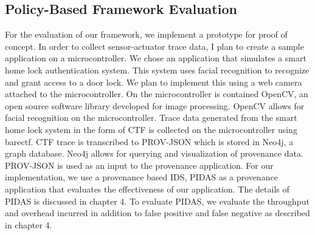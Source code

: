 


\subsection{Policy-Based Framework Evaluation}

For the evaluation of our framework, we implement a prototype for proof of concept. In order to collect sensor-actuator trace data, I plan to create a sample application on a microcontroller. We chose an application that simulates a smart home lock authentication system. This system uses facial recognition to recognize and grant access to a door lock. We plan to implement this using a web camera attached to the microcontroller. On the microcontroller is contained OpenCV, an open source software library developed for image processing. OpenCV allows for facial recognition on the microcontroller. Trace data generated from the smart home lock system in the form of CTF  is collected on the microcontroller using barectf. CTF trace is transcribed to PROV-JSON which is stored in Neo4j, a graph database.  Neo4j allows for querying and visualization of provenance data. PROV-JSON is used as an input to the provenance application. For our implementation, we use a provenance based IDS, PIDAS as a provenance application that evaluates the effectiveness of our application. The details of PIDAS is discussed in chapter 4. To evaluate PIDAS, we evaluate the throughput and overhead incurred in addition to false positive and false negative as described in chapter 4.







%

